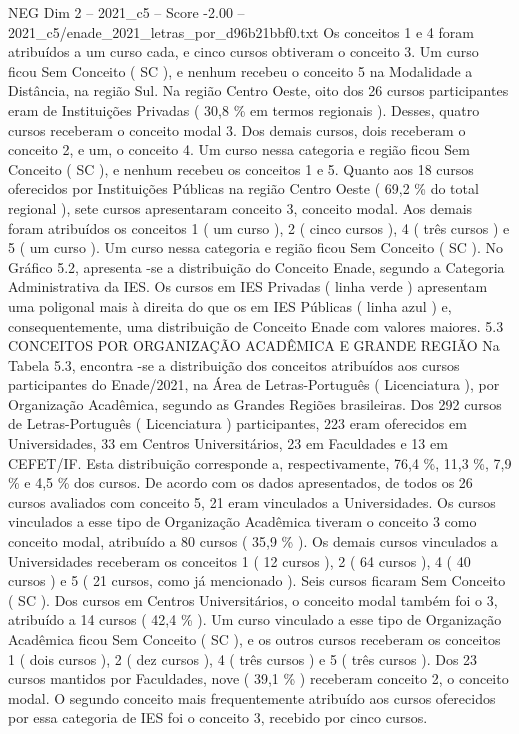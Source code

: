 \begin{textsample}{NEG Dim 2 – 2021\_c5 – Score -2.00 – 2021\_c5/enade\_2021\_letras\_por\_d96b21bbf0.txt}
Os conceitos 1 e 4 foram atribuídos a um curso cada, e cinco cursos obtiveram o conceito 3.
Um curso ficou Sem Conceito ( SC ), e nenhum recebeu o conceito 5 na Modalidade a Distância, na região Sul.
Na região Centro Oeste, oito dos 26 cursos participantes eram de Instituições Privadas ( 30,8 \% em termos regionais ).
Desses, quatro cursos receberam o conceito modal 3.
Dos demais cursos, dois receberam o conceito 2, e um, o conceito 4.
Um curso nessa categoria e região ficou Sem Conceito ( SC ), e nenhum recebeu os conceitos 1 e 5.
Quanto aos 18 cursos oferecidos por Instituições Públicas na região Centro Oeste ( 69,2 \% do total regional ), sete cursos apresentaram conceito 3, conceito modal.
Aos demais foram atribuídos os conceitos 1 ( um curso ), 2 ( cinco cursos ), 4 ( três cursos ) e 5 ( um curso ).
Um curso nessa categoria e região ficou Sem Conceito ( SC ).
No Gráfico 5.2, apresenta -se a distribuição do Conceito Enade, segundo a Categoria Administrativa da IES.
Os cursos em IES Privadas ( linha verde ) apresentam uma poligonal mais à direita do que os em IES Públicas ( linha azul ) e, consequentemente, uma distribuição de Conceito Enade com valores maiores. 5.3 CONCEITOS POR ORGANIZAÇÃO ACADÊMICA E GRANDE REGIÃO Na Tabela 5.3, encontra -se a distribuição dos conceitos atribuídos aos cursos participantes do Enade/2021, na Área de Letras-Português ( Licenciatura ), por Organização Acadêmica, segundo as Grandes Regiões brasileiras.
Dos 292 cursos de Letras-Português ( Licenciatura ) participantes, 223 eram oferecidos em Universidades, 33 em Centros Universitários, 23 em Faculdades e 13 em CEFET/IF.
Esta distribuição corresponde a, respectivamente, 76,4 \%, 11,3 \%, 7,9 \% e 4,5 \% dos cursos.
De acordo com os dados apresentados, de todos os 26 cursos avaliados com conceito 5, 21 eram vinculados a Universidades.
Os cursos vinculados a esse tipo de Organização Acadêmica tiveram o conceito 3 como conceito modal, atribuído a 80 cursos ( 35,9 \% ).
Os demais cursos vinculados a Universidades receberam os conceitos 1 ( 12 cursos ), 2 ( 64 cursos ), 4 ( 40 cursos ) e 5 ( 21 cursos, como já mencionado ).
Seis cursos ficaram Sem Conceito ( SC ).
Dos cursos em Centros Universitários, o conceito modal também foi o 3, atribuído a 14 cursos ( 42,4 \% ).
Um curso vinculado a esse tipo de Organização Acadêmica ficou Sem Conceito ( SC ), e os outros cursos receberam os conceitos 1 ( dois cursos ), 2 ( dez cursos ), 4 ( três cursos ) e 5 ( três cursos ).
Dos 23 cursos mantidos por Faculdades, nove ( 39,1 \% ) receberam conceito 2, o conceito modal.
O segundo conceito mais frequentemente atribuído aos cursos oferecidos por essa categoria de IES foi o conceito 3, recebido por cinco cursos.

\end{textsample}
